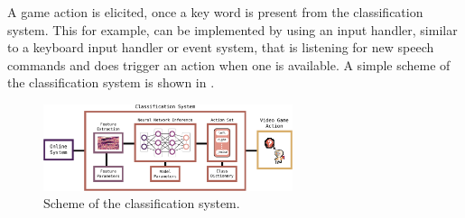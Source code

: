 A game action is elicited, once a key word is present from the classification system.
This for example, can be implemented by using an input handler, similar to a keyboard input handler or event system, that is listening for new speech commands and does trigger an action when one is available.
A simple scheme of the classification system is shown in .
\begin{figure}[!ht]
  \centering
  \includegraphics[width=0.65\textwidth]{./6_game/figs/game_system_classification.pdf}
  \caption{Scheme of the classification system.}
  \label{fig:game_system_classification}
\end{figure}
\FloatBarrier
\noindent

